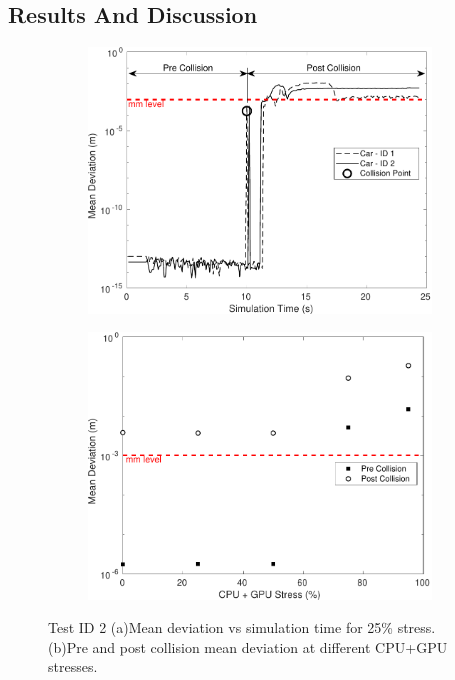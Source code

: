 \subsection{Results And Discussion}
\begin{figure}[h]
    \centering
    \begin{subfigure}{.49\textwidth}
        \includegraphics[width=1\textwidth]{Other/Figures/CarsCollisionCG25.pdf}
        \caption{}
        \label{CarsCollisionCG25}
    \end{subfigure}
    \begin{subfigure}{.49\textwidth}
        \includegraphics[width=1\textwidth]{Other/Figures/CarsCollisionPrePost.pdf}
        \caption{}
        \label{CarsCollisionPrePost}
    \end{subfigure}
    \caption{Test ID 2 (a)Mean deviation vs simulation time for 25\% stress. (b)Pre and post collision mean deviation at different CPU+GPU stresses.}
\end{figure}

